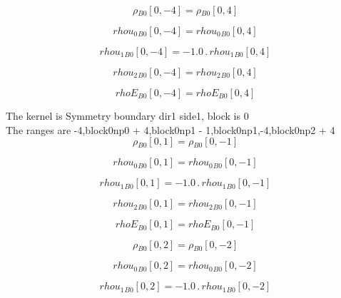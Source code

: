 \documentclass{article}
\begin{document}
\begin{dmath}{\rho{_{B0}}}[{0,-4}] = {\rho{_{B0}}}[{0,4}]\end{dmath}

\begin{dmath}{rhou_{0}{_{B0}}}[{0,-4}] = {rhou_{0}{_{B0}}}[{0,4}]\end{dmath}

\begin{dmath}{rhou_{1}{_{B0}}}[{0,-4}] = - 1.0 \,.\, {rhou_{1}{_{B0}}}[{0,4}]\end{dmath}

\begin{dmath}{rhou_{2}{_{B0}}}[{0,-4}] = {rhou_{2}{_{B0}}}[{0,4}]\end{dmath}

\begin{dmath}{rhoE{_{B0}}}[{0,-4}] = {rhoE{_{B0}}}[{0,4}]\end{dmath}

\noindent The kernel is Symmetry boundary dir1 side1, block is 0\\\noindent The ranges are -4,block0np0 + 4,block0np1 - 1,block0np1,-4,block0np2 + 4\\\begin{dmath}{\rho{_{B0}}}[{0,1}] = {\rho{_{B0}}}[{0,-1}]\end{dmath}

\begin{dmath}{rhou_{0}{_{B0}}}[{0,1}] = {rhou_{0}{_{B0}}}[{0,-1}]\end{dmath}

\begin{dmath}{rhou_{1}{_{B0}}}[{0,1}] = - 1.0 \,.\, {rhou_{1}{_{B0}}}[{0,-1}]\end{dmath}

\begin{dmath}{rhou_{2}{_{B0}}}[{0,1}] = {rhou_{2}{_{B0}}}[{0,-1}]\end{dmath}

\begin{dmath}{rhoE{_{B0}}}[{0,1}] = {rhoE{_{B0}}}[{0,-1}]\end{dmath}

\begin{dmath}{\rho{_{B0}}}[{0,2}] = {\rho{_{B0}}}[{0,-2}]\end{dmath}

\begin{dmath}{rhou_{0}{_{B0}}}[{0,2}] = {rhou_{0}{_{B0}}}[{0,-2}]\end{dmath}

\begin{dmath}{rhou_{1}{_{B0}}}[{0,2}] = - 1.0 \,.\, {rhou_{1}{_{B0}}}[{0,-2}]\end{dmath}
\end{document}
